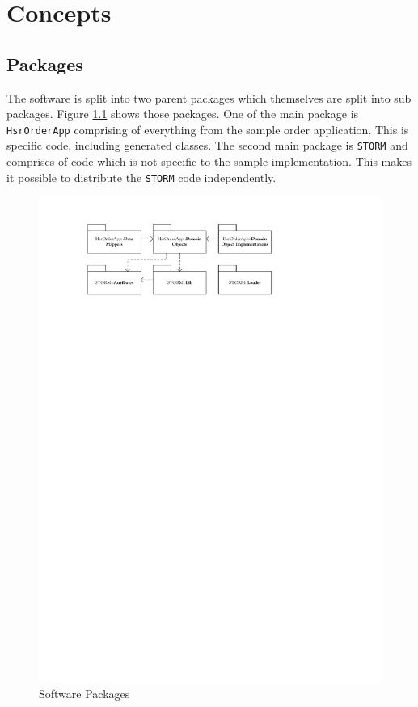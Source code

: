 \chapter{Concepts}
	\section{Packages}
		The software is split into two parent packages which themselves are split into
		sub packages. Figure \ref{fig:designPackages} shows those packages. One of
		the main package is \verb~HsrOrderApp~ comprising of everything from 
		the sample order application. This is specific code, including generated classes.
		The second main package is \verb~STORM~ and comprises of code which is not specific to
		the sample implementation. This makes it possible to distribute the \verb~STORM~ code
		independently.
	
		\begin{figure}[htb]
			\begin{center}
				\includegraphics{./files/inc/figures/designPackages}
				\caption{\label{fig:designPackages} Software Packages}
			\end{center}
		\end{figure}
		
